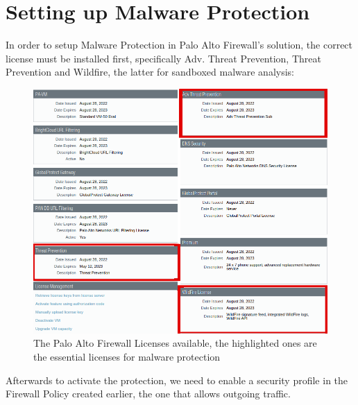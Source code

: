\newpage

\section{Setting up Malware Protection}

In order to setup Malware Protection in Palo Alto Firewall's solution, the correct license must be installed first, specifically Adv. Threat Prevention, Threat Prevention and Wildfire, the latter for sandboxed malware analysis:

\begin{figure}[h!]
 \centering
 \includegraphics[width=13.5cm]{img/PAN_Licenses.png}
 \caption{The Palo Alto Firewall Licenses available, the highlighted ones are the essential licenses for malware protection}
 \label{fig: PanOS Licenses}
\end{figure}

\newpage

Afterwards to activate the protection, we need to enable a security profile in the Firewall Policy created earlier, the one that allows outgoing traffic.


